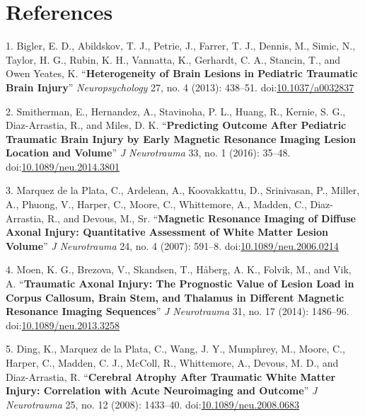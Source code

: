 \documentclass[11pt,]{article}
\begin{document}
\clearpage

\listofchanges

\clearpage

\section*{References}\label{references}

\hypertarget{refs}{}
\hypertarget{ref-Bigler:2013aa}{}
1. Bigler, E. D., Abildskov, T. J., Petrie, J., Farrer, T. J., Dennis,
M., Simic, N., Taylor, H. G., Rubin, K. H., Vannatta, K., Gerhardt, C.
A., Stancin, T., and Owen Yeates, K. ``\textbf{Heterogeneity of Brain
Lesions in Pediatric Traumatic Brain Injury}'' \emph{Neuropsychology}
27, no. 4 (2013): 438--51.
doi:\href{https://doi.org/10.1037/a0032837}{10.1037/a0032837}

\hypertarget{ref-Smitherman:2016aa}{}
2. Smitherman, E., Hernandez, A., Stavinoha, P. L., Huang, R., Kernie,
S. G., Diaz-Arrastia, R., and Miles, D. K. ``\textbf{Predicting Outcome
After Pediatric Traumatic Brain Injury by Early Magnetic Resonance
Imaging Lesion Location and Volume}'' \emph{J Neurotrauma} 33, no. 1
(2016): 35--48.
doi:\href{https://doi.org/10.1089/neu.2014.3801}{10.1089/neu.2014.3801}

\hypertarget{ref-Marquez-de-la-Plata:2007aa}{}
3. Marquez de la Plata, C., Ardelean, A., Koovakkattu, D., Srinivasan,
P., Miller, A., Phuong, V., Harper, C., Moore, C., Whittemore, A.,
Madden, C., Diaz-Arrastia, R., and Devous, M., Sr. ``\textbf{Magnetic
Resonance Imaging of Diffuse Axonal Injury: Quantitative Assessment of
White Matter Lesion Volume}'' \emph{J Neurotrauma} 24, no. 4 (2007):
591--8.
doi:\href{https://doi.org/10.1089/neu.2006.0214}{10.1089/neu.2006.0214}

\hypertarget{ref-Moen:2014aa}{}
4. Moen, K. G., Brezova, V., Skandsen, T., Håberg, A. K., Folvik, M.,
and Vik, A. ``\textbf{Traumatic Axonal Injury: The Prognostic Value of
Lesion Load in Corpus Callosum, Brain Stem, and Thalamus in Different
Magnetic Resonance Imaging Sequences}'' \emph{J Neurotrauma} 31, no. 17
(2014): 1486--96.
doi:\href{https://doi.org/10.1089/neu.2013.3258}{10.1089/neu.2013.3258}

\hypertarget{ref-Ding:2008aa}{}
5. Ding, K., Marquez de la Plata, C., Wang, J. Y., Mumphrey, M., Moore,
C., Harper, C., Madden, C. J., McColl, R., Whittemore, A., Devous, M.
D., and Diaz-Arrastia, R. ``\textbf{Cerebral Atrophy After Traumatic
White Matter Injury: Correlation with Acute Neuroimaging and Outcome}''
\emph{J Neurotrauma} 25, no. 12 (2008): 1433--40.
doi:\href{https://doi.org/10.1089/neu.2008.0683}{10.1089/neu.2008.0683}
\end{document}
